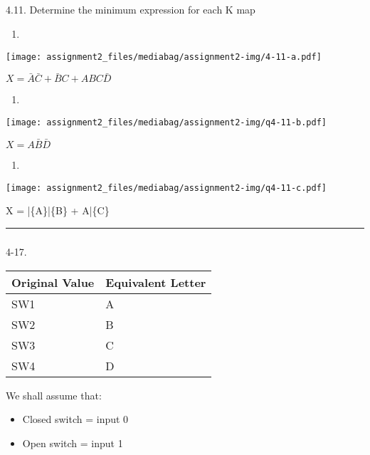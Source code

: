 \documentclass[
  a4paper,
]{article}
\makeatletter
\let\oldsubparagraph\subparagraph
\renewcommand{\subparagraph}{
    \@ifstar
      \xxxSubParagraphStar
      \xxxSubParagraphNoStar
  }
\newcommand{\xxxSubParagraphStar}[1]{\oldsubparagraph*{#1}\mbox{}}
\newcommand{\xxxSubParagraphNoStar}[1]{\oldsubparagraph{#1}\mbox{}}
\providecommand{\tightlist}{%
  \setlength{\itemsep}{0pt}\setlength{\parskip}{0pt}}
\makeatother
\begin{document}
\subparagraph{4.11. Determine the minimum expression for each K
map}\label{determine-the-minimum-expression-for-each-k-map}

\begin{enumerate}
\def\labelenumi{\alph{enumi}.}
\tightlist
\item
\end{enumerate}

\texttt{[image: assignment2\_files/mediabag/assignment2-img/4-11-a.pdf]}

\(X = \bar{A}\bar{C} + \bar{B}C + ABC\bar{D}\)

\begin{enumerate}
\def\labelenumi{\alph{enumi}.}
\setcounter{enumi}{1}
\tightlist
\item
\end{enumerate}

\texttt{[image: assignment2\_files/mediabag/assignment2-img/q4-11-b.pdf]}

\(X = A\bar{B}\bar{D}\)

\newpage{}

\begin{enumerate}
\def\labelenumi{\alph{enumi}.}
\setcounter{enumi}{2}
\tightlist
\item
\end{enumerate}

\texttt{[image: assignment2\_files/mediabag/assignment2-img/q4-11-c.pdf]}

X = \bar\{A\}\bar\{B\} + A\bar\{C\}

\begin{center}\rule{0.5\linewidth}{0.5pt}\end{center}

\subparagraph{4-17.}\label{section-3}

\begin{longtable}[]{@{}ll@{}}
\toprule\noalign{}
Original Value & Equivalent Letter \\
\midrule\noalign{}
\endhead
\bottomrule\noalign{}
\endlastfoot
SW1 & A \\
SW2 & B \\
SW3 & C \\
SW4 & D \\
\end{longtable}

We shall assume that:

\begin{itemize}
\tightlist
\item
  Closed switch = input 0
\item
  Open switch = input 1
\end{itemize}
\end{document}
